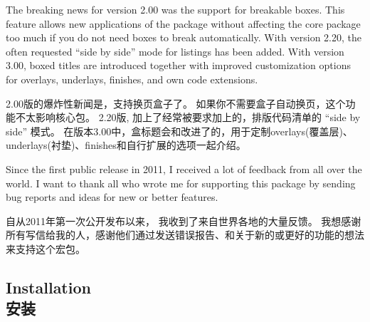 The breaking news for version 2.00 was the support for breakable boxes.%
This feature allows new applications of the package without affecting the core package too much if you do not need boxes to break automatically.%
With version 2.20, the often requested \enquote{side by side} mode for listings has been added.%
With version 3.00, boxed titles are introduced together with improved customization options for overlays, underlays, finishes, and own code extensions.%

2.00版的爆炸性新闻是，支持换页盒子了。%
如果你不需要盒子自动换页，这个功能不太影响核心包。%
2.20版, 加上了经常被要求加上的，排版代码清单的 \enquote{side by side} 模式。%
在版本3.00中，盒标题会和改进了的，用于定制overlays(覆盖层)、underlays(衬垫)、finishes和自行扩展的选项一起介绍。


\begin{tcolorbox}[enhanced,%
boxrule=0mm,boxsep=0mm,%
frame hidden,interior hidden,%
left=0mm,right=0mm,top=0mm,bottom=0mm,%
watermark opacity=0.25,watermark zoom=1.2,%
before=\par\smallskip,%
clip watermark=false,%
watermark tikz={%
\path[fill=yellow,draw=yellow!75!red] (0,0) circle (1cm);%
\fill[red] (45:5mm) circle (1mm);\fill[red] (135:5mm) circle (1mm);%
\draw[line width=1mm,red] (215:5mm) arc (215:325:5mm);}]%
Since the first public release in 2011, %
I received a lot of feedback from all over the world.%
I want to thank all who wrote me for supporting this package by sending bug reports and ideas for new or better features.

自从2011年第一次公开发布以来，%
我收到了来自世界各地的大量反馈。%
我想感谢所有写信给我的人，感谢他们通过发送错误报告、和关于新的或更好的功能的想法来支持这个宏包。
\end{tcolorbox}
    

\subsection{Installation\\安装}

